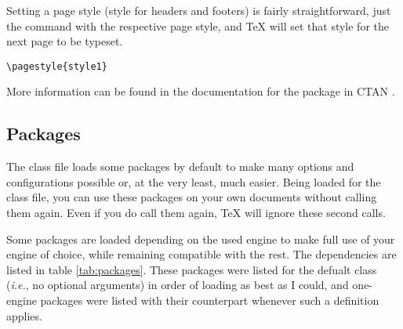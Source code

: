 \documentclass[palatino,english]{ist-report}
\begin{document}
Setting a page style (style for headers and footers) is fairly straightforward, just the \texttt{\pagestyle} command with the respective page style, and \TeX{} will set that style for the next page to be typeset.
\begin{verbatim}
\pagestyle{style1}
\end{verbatim}
More information can be found in the documentation for the  package in CTAN \cite{ctan}.


\subsection{Packages}\label{sec:packages}

The class file loads some packages by default to make many options and configurations possible or, at the very least, much easier. Being loaded for the class file, you can use these packages on your own documents without calling them again. Even if you do call them again, \TeX{} will ignore these second calls.

Some packages are loaded depending on the used engine to make full use of your engine of choice, while remaining compatible with the rest. The dependencies are listed in table \ref{tab:packages}. These packages were listed for the defualt class (\textit{i.e.}, no optional arguments) in order of loading as best as I could, and one-engine packages were listed with their counterpart whenever such a definition applies.
\end{document}
